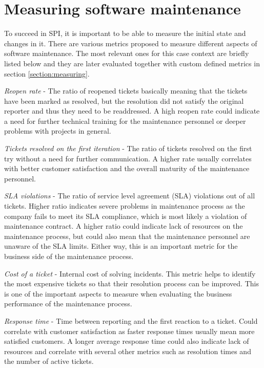 \section{Measuring software maintenance}
\label{section:literature-metrics}

To succeed in SPI, it is important to be able to measure the initial state and changes in it. There are various metrics proposed to measure different aspects of
software maintenance. The most relevant ones for this case context are briefly listed below and they are later evaluated together with custom defined metrics in section
\ref{section:measuring}.

\emph{Reopen rate} - The ratio of reopened tickets basically meaning that the tickets have been marked as resolved, but the resolution did not satisfy the original reporter
and thus they need to be readdressed. A high reopen rate could indicate a need for further technical training for the maintenance personnel or deeper problems with projects in
general. \citep{Livy2017}

\emph{Tickets resolved on the first iteration} - The ratio of tickets resolved on the first try without a need for further communication. A higher rate usually correlates with
better customer satisfaction and the overall maturity of the maintenance personnel. \citep{Livy2017}

\emph{SLA violations} - The ratio of service level agreement (SLA) violations out of all tickets. Higher ratio indicates severe problems in maintenance process as the company fails to meet
its SLA compliance, which is most likely a violation of maintenance contract. A higher ratio could indicate lack of resources on the maintenance process, but could also
mean that the maintenance personnel are unaware of the SLA limits. Either way, this is an important metric for the business side of the maintenance process. \citep{Livy2017}

\emph{Cost of a ticket} - Internal cost of solving incidents. This metric helps to identify the most expensive tickets so that their resolution process can be improved.
This is one of the important aspects to measure when evaluating the business performance of the maintenance process. \citep{Livy2017}

\emph{Response time} - Time between reporting and the first reaction to a ticket. Could correlate with customer satisfaction as faster response times usually mean
more satisfied customers. A longer average response time could also indicate lack of resources and correlate with several other metrics such as resolution times and the number of
active tickets. \citep{Paschke2006}

